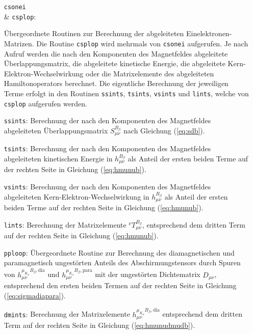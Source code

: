 \begin{itemize}[leftmargin=60pt]
\item[{\parbox[t]{0.145\linewidth}{\texttt{csonei} \\ \& \texttt{csplop}:}}]\parbox[t]{1\linewidth}{Übergeordnete Routinen zur Berechnung der abgeleiteten Einelektronen-Matrizen. Die Routine \texttt{csplop} wird mehrmals von \texttt{csonei} aufgerufen. Je nach Aufruf werden die nach den Komponenten des Magnetfeldes abgeleitete Überlappungsmatrix, die abgeleitete kinetische Energie, die abgeleitete Kern-Elektron-Wechselwirkung oder die Matrixelemente des abgeleiteten Hamiltonoperators berechnet. Die eigentliche Berechnung der jeweiligen Terme erfolgt in den Routinen \texttt{ssints}, \texttt{tsints}, \texttt{vsints} und \texttt{lints}, welche von \texttt{csplop} aufgerufen werden.}
\item[\texttt{ssints}:] Berechnung der nach den Komponenten des Magnetfeldes abgeleiteten Überlappungsmatrix $S_{\mu\nu}^{B_\beta}$ nach Gleichung (\ref{eq:sdb}).
\item[\texttt{tsints}:] Berechnung der nach den Komponenten des Magnetfeldes abgeleiteten kinetischen Energie in $h_{\mu\nu}^{B_\beta}$ als Anteil der ersten beiden Terme auf der rechten Seite in Gleichung (\ref{eq:hmunub}).
\item[\texttt{vsints}:] Berechnung der nach den Komponenten des Magnetfeldes abgeleiteten Kern-Elektron-Wechselwirkung in $h_{\mu\nu}^{B_\beta}$ als Anteil der ersten beiden Terme auf der rechten Seite in Gleichung (\ref{eq:hmunub}).
\item[\texttt{lints}:] Berechnung der Matrixelemente $^{\nu}T_{\mu\nu}^{B_\beta}$, entsprechend dem dritten Term auf der rechten Seite in Gleichung (\ref{eq:hmunub}).
\item[\texttt{pploop}:] Übergeordnete Routine zur Berechnung des diamagnetischen und paramagnetisch ungestörten Anteils des Abschirmungstensors durch Spuren von $h_{\mu\nu}^{\mu_{K_\alpha}B_\beta,\textrm{dia}}$ und $h_{\mu\nu}^{\mu_{K_\alpha}B_\beta,\textrm{para}}$ mit der ungestörten Dichtematrix $D_{\mu\nu}$, entsprechend den ersten beiden Termen auf der rechten Seite in Gleichung (\ref{eq:sigmadiapara}). 
\item[\texttt{dmints}:] Berechnung der Matrixelemente $h_{\mu\nu}^{\mu_{K_\alpha}B_\beta,\textrm{dia}}$ entsprechend dem dritten Term auf der rechten Seite in Gleichung (\ref{eq:hmunudmudb}).

\end{itemize}
